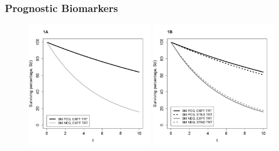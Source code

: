 \documentclass{beamer}
\begin{document}
\begin{frame}
\frametitle{Prognostic Biomarkers}

\begin{figure}
    \includegraphics[width=0.475\textwidth]{prognostic.jpg}
    \hfill
    \includegraphics[width=0.475\textwidth]{prognostic2.jpg}
 \end{figure}

\end{frame}
\end{document}
